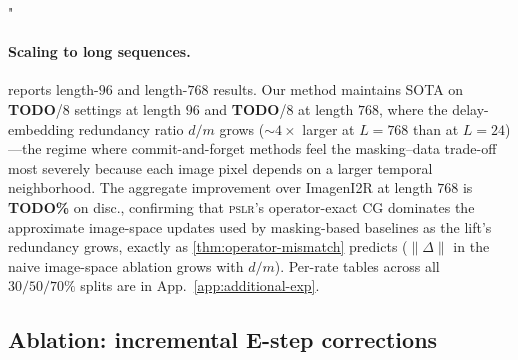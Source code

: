 "\documentclass{article}
\theoremstyle{plain}
\theoremstyle{definition}
\theoremstyle{remark}
\newcommand{\pslr}{\textsc{pslr}}
\begin{document}
\paragraph{Scaling to long sequences.}
 reports length-$96$ and length-$768$ results. Our method maintains SOTA on \textbf{TODO}/$8$ settings at length $96$ and \textbf{TODO}/$8$ at length $768$, where the delay-embedding redundancy ratio $d/m$ grows ($\sim 4\times$ larger at $L{=}768$ than at $L{=}24$)---the regime where commit-and-forget methods feel the masking--data trade-off most severely because each image pixel depends on a larger temporal neighborhood. The aggregate improvement over ImagenI2R at length $768$ is \textbf{TODO\%} on disc., confirming that \pslr{}'s operator-exact CG dominates the approximate image-space updates used by masking-based baselines as the lift's redundancy grows, exactly as \cref{thm:operator-mismatch} predicts ($\|\Delta\|$ in the naive image-space ablation grows with $d/m$). Per-rate tables across all $30/50/70\%$ splits are in App.~\ref{app:additional-exp}.

\vspace{-1mm}
\subsection{Ablation: incremental E-step corrections}
\label{sec:ablation}
\vspace{-1mm}
\end{document}

